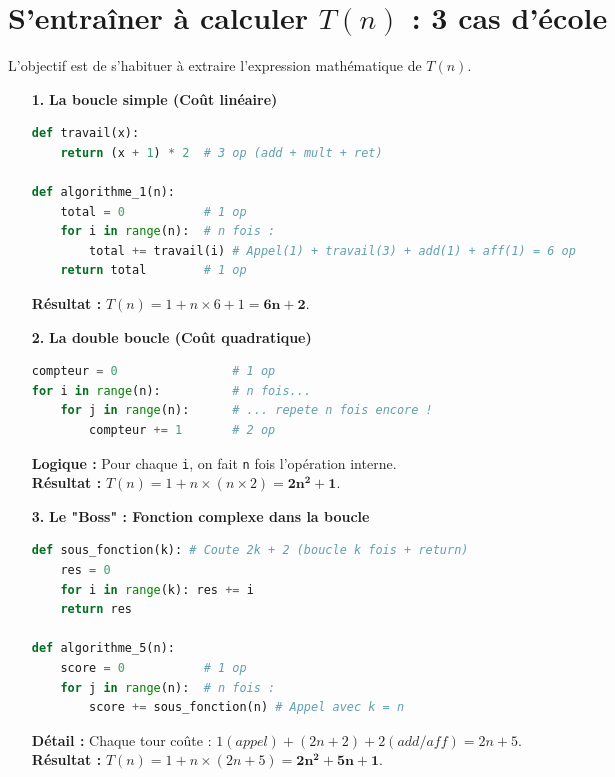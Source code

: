 \newpage

\section*{S'entraîner à calculer $T(n)$ : 3 cas d'école }

L'objectif est de s'habituer à extraire l'expression mathématique de $T(n)$.

\vspace{0.3cm}

\begin{itemize}
    \item[\textbf{1.}] \textbf{La boucle simple (Coût linéaire)}
\begin{lstlisting}[style=pythonstyle, language=python]
def travail(x):
    return (x + 1) * 2  # 3 op (add + mult + ret)

def algorithme_1(n):
    total = 0           # 1 op 
    for i in range(n):  # n fois :
        total += travail(i) # Appel(1) + travail(3) + add(1) + aff(1) = 6 op 
    return total        # 1 op
\end{lstlisting}
    \textbf{Résultat :} $T(n) = 1 + n \times 6 + 1 = \mathbf{6n + 2}$.

    \vspace{0.5cm}

    \item[\textbf{2.}] \textbf{La double boucle (Coût quadratique)}
\begin{lstlisting}[style=pythonstyle, language=python]
compteur = 0                # 1 op
for i in range(n):          # n fois...
    for j in range(n):      # ... repete n fois encore !
        compteur += 1       # 2 op
\end{lstlisting}
    \textbf{Logique :} Pour chaque \texttt{i}, on fait \texttt{n} fois l'opération interne. \\
    \textbf{Résultat :} $T(n) = 1 + n \times (n \times 2) = \mathbf{2n^2 + 1}$.

    \vspace{0.5cm}

    \item[\textbf{3.}] \textbf{Le "Boss" : Fonction complexe dans la boucle}
\begin{lstlisting}[style=pythonstyle, language=python]
def sous_fonction(k): # Coute 2k + 2 (boucle k fois + return)
    res = 0
    for i in range(k): res += i 
    return res

def algorithme_5(n):
    score = 0           # 1 op
    for j in range(n):  # n fois :
        score += sous_fonction(n) # Appel avec k = n
\end{lstlisting}
    \textbf{Détail :} Chaque tour coûte : $1(appel) + (2n + 2) + 2(add/aff) = 2n + 5$. \\
    \textbf{Résultat :} $T(n) = 1 + n \times (2n + 5) = \mathbf{2n^2 + 5n + 1}$.
\end{itemize}